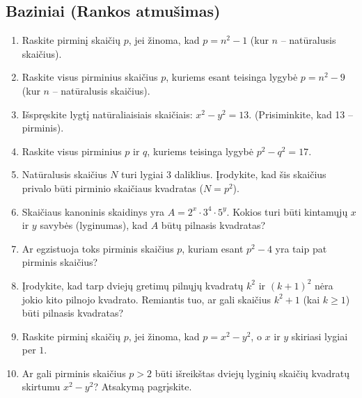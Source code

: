 \documentclass[11pt,a4paper]{scrartcl}
\begin{document}
\subsection*{Baziniai (Rankos atmušimas)}
\begin{enumerate}
    \item Raskite pirminį skaičių $p$, jei žinoma, kad $p = n^2 - 1$ (kur $n$ – natūralusis skaičius).
    \item Raskite visus pirminius skaičius $p$, kuriems esant teisinga lygybė $p = n^2 - 9$ (kur $n$ – natūralusis skaičius).
    \item Išspręskite lygtį natūraliaisiais skaičiais: $x^2 - y^2 = 13$. (Prisiminkite, kad 13 – pirminis).
    \item Raskite visus pirminius $p$ ir $q$, kuriems teisinga lygybė $p^2 - q^2 = 17$.
    \item Natūralusis skaičius $N$ turi lygiai $3$ daliklius. Įrodykite, kad šis skaičius privalo būti pirminio skaičiaus kvadratas ($N = p^2$).
    \item Skaičiaus kanoninis skaidinys yra $A = 2^x \cdot 3^4 \cdot 5^y$. Kokios turi būti kintamųjų $x$ ir $y$ savybės (lyginumas), kad $A$ būtų pilnasis kvadratas?
    \item Ar egzistuoja toks pirminis skaičius $p$, kuriam esant $p^2 - 4$ yra taip pat pirminis skaičius?
    \item Įrodykite, kad tarp dviejų gretimų pilnųjų kvadratų $k^2$ ir $(k+1)^2$ nėra jokio kito pilnojo kvadrato. Remiantis tuo, ar gali skaičius $k^2 + 1$ (kai $k \ge 1$) būti pilnasis kvadratas?
    \item Raskite pirminį skaičių $p$, jei žinoma, kad $p = x^2 - y^2$, o $x$ ir $y$ skiriasi lygiai per $1$.
    \item Ar gali pirminis skaičius $p > 2$ būti išreikštas dviejų lyginių skaičių kvadratų skirtumu $x^2 - y^2$? Atsakymą pagrįskite.
\end{enumerate}
\end{document}
